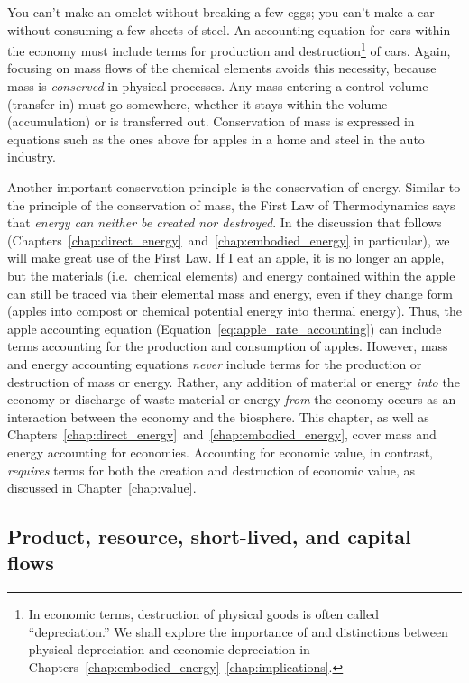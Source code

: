 You can't make an omelet without breaking a few eggs;
you can't make a car without consuming a few sheets of steel.
An accounting equation for cars within the economy
must include terms for production and destruction\footnote{In economic terms,
destruction of physical goods is often called ``depreciation.'' We shall 
explore the importance of and distinctions between 
physical depreciation and economic depreciation 
in Chapters~\ref{chap:embodied_energy}--\ref{chap:implications}.}
of cars.
Again, focusing on mass flows of the chemical elements avoids this necessity, 
because mass is \emph{conserved} in physical processes.
Any mass entering a control volume (transfer in) 
must go somewhere, 
whether it stays within the volume (accumulation) 
or is transferred out.
Conservation of mass is expressed in equations such as the ones above
for apples in a home and steel in the auto industry. 

Another important conservation principle is the conservation of energy.
Similar to the principle of the conservation of mass,
the First Law of Thermodynamics
says that \emph{energy can neither be created nor destroyed}. 
In the discussion that follows 
(Chapters~\ref{chap:direct_energy}~and~\ref{chap:embodied_energy} in particular), 
we will make great use 
of the First Law.
If I eat an apple, it is no longer an apple, 
but the materials (i.e.\ chemical elements) 
and energy contained
within the apple can still be traced 
via their elemental mass and energy,
even if they change form (apples into compost or 
chemical potential energy into thermal energy).
Thus, the apple accounting equation
(Equation~\ref{eq:apple_rate_accounting}) 
can include terms accounting for the production 
and consumption of apples. 
However, 
mass and energy accounting equations 
\emph{never} include terms for the 
production or destruction of mass or energy. 
Rather, any addition of material or energy 
\emph{into} the economy
or discharge of waste material or energy 
\emph{from} the economy
occurs as an interaction between 
the economy and the biosphere.
This chapter, as well as 
Chapters~\ref{chap:direct_energy}~and~\ref{chap:embodied_energy},
cover mass and energy
accounting for economies.
Accounting for economic value, in contrast, 
\emph{requires} terms for both the creation
and destruction of economic value,
as discussed in Chapter~\ref{chap:value}.


\subsection{Product, resource, short-lived, and capital flows}

